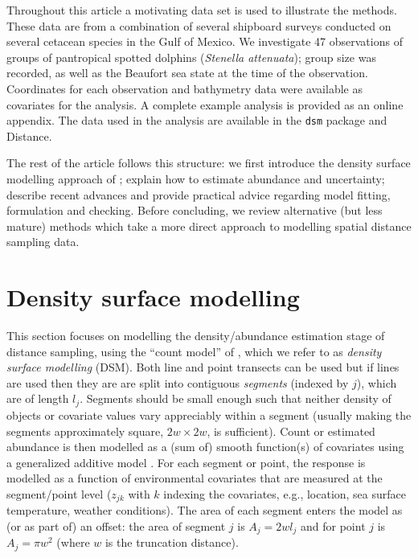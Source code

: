 \documentclass[a4paper,12pt]{article}
\begin{document}
Throughout this article a motivating data set is used to illustrate the methods. These data are from a combination of several shipboard surveys conducted on several cetacean species in the Gulf of Mexico. We investigate 47 observations of groups of pantropical spotted dolphins (\textit{Stenella attenuata}); group size was recorded, as well as the Beaufort sea state at the time of the observation. Coordinates for each observation and bathymetry data were available as covariates for the analysis. A complete example analysis is provided as an online appendix. The data used in the analysis are available in the \texttt{dsm} package and Distance.

The rest of the article follows this structure: we first introduce the density surface modelling approach of \cite{Hedley:2004et}; explain how to estimate abundance and uncertainty; describe recent advances and provide practical advice regarding model fitting, formulation and checking. Before concluding, we review alternative (but less mature) methods which take a more direct approach to modelling spatial distance sampling data.


\section*{Density surface modelling}
\label{s:dsm}

This section focuses on modelling the density/abundance estimation stage of distance sampling, using the ``count model'' of \cite{Hedley:2004et}, which we refer to as \textit{density surface modelling} (DSM). Both line and point transects can be used but if lines are used then they are are split into contiguous \textit{segments} (indexed by $j$), which are of length $l_j$. Segments should be small enough such that neither density of objects or covariate values vary appreciably within a segment (usually making the segments approximately square, $2w\times 2w$, is sufficient). Count or estimated abundance is then modelled as a (sum of) smooth function(s) of covariates using a generalized additive model \cite[GAM; e.g.][]{Wood:2006wz}. For each segment or point, the response is modelled as a function of environmental covariates that are measured at the segment/point level ($z_{jk}$ with $k$ indexing the covariates, e.g., location, sea surface temperature, weather conditions). The area of each segment enters the model as (or as part of) an offset: the area of segment $j$ is $A_j = 2wl_j$ and for point $j$ is $A_j=\pi w^2$ (where $w$ is the truncation distance). 
\end{document}
